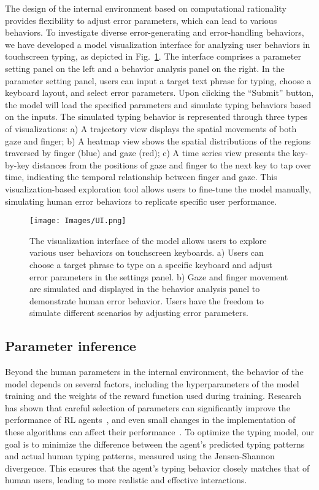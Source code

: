 The design of the internal environment based on computational rationality provides flexibility to adjust error parameters, which can lead to various behaviors.
To investigate diverse error-generating and error-handling behaviors, we have developed a model visualization interface for analyzing user behaviors in touchscreen typing, as depicted in Fig.~\ref{fig:UI}. The interface comprises a parameter setting panel on the left and a behavior analysis panel on the right. In the parameter setting panel, users can input a target text phrase for typing, choose a keyboard layout, and select error parameters. Upon clicking the ``Submit'' button, the model will load the specified parameters and simulate typing behaviors based on the inputs. The simulated typing behavior is represented through three types of visualizations:  a) A trajectory view displays the spatial movements of both gaze and finger; b) A heatmap view shows the spatial distributions of the regions traversed by finger (blue) and gaze (red); c) A time series view presents the key-by-key distances from the positions of gaze and finger to the next key to tap over time, indicating the temporal relationship between finger and gaze. This visualization-based exploration tool allows users to fine-tune the model manually, simulating human error behaviors to replicate specific user performance.

\begin{figure}[!h]
\centering
  \texttt{[image: Images/UI.png]}
  \caption{The visualization interface of the model allows users to explore various user behaviors on touchscreen keyboards. a) Users can choose a target phrase to type on a specific keyboard and adjust error parameters in the settings panel. b) Gaze and finger movement are simulated and displayed in the behavior analysis panel to demonstrate human error behavior. Users have the freedom to simulate different scenarios by adjusting error parameters.}
  \label{fig:UI}
\end{figure}

\subsection{Parameter inference}
\label{sec:optimization}


Beyond the human parameters in the internal environment, the behavior of the model depends on several factors, including the hyperparameters of the model training and the weights of the reward function used during training. Research has shown that careful selection of parameters can significantly improve the performance of RL agents~\cite{andrychowicz_what_2020, paine_hyperparameter_2020, yang_efficient_2021}, and even small changes in the implementation of these algorithms can affect their performance~\cite{engstrom_implementation_2020}. To optimize the typing model, our goal is to minimize the difference between the agent's predicted typing patterns and actual human typing patterns, measured using the Jensen-Shannon divergence. This ensures that the agent's typing behavior closely matches that of human users, leading to more realistic and effective interactions.

